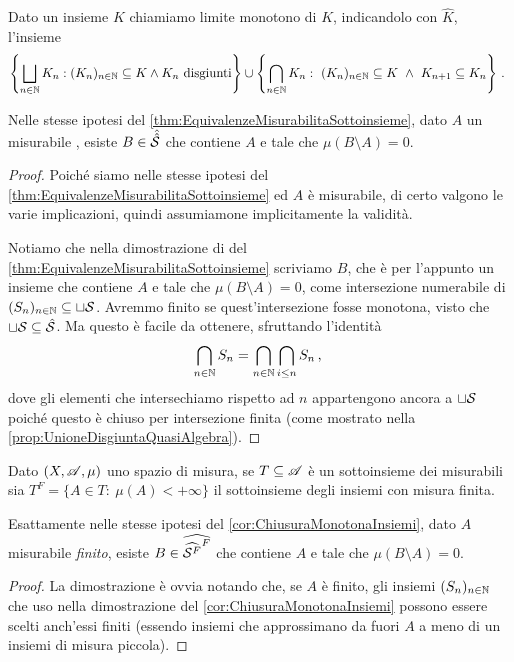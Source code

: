 \begin{corollary}\label{cor:ChiusuraMonotonaInsiemi}
	Dato un insieme $K$ chiamiamo limite monotono di $K$, indicandolo con $\hat K$, l'insieme
	\begin{equation*}
		\left\{\bigsqcup_{n\in\N}K_n:(K_n)_{n\in\N}\subseteq K\wedge K_n \text{ disgiunti}\right\}\cup
		\left\{\bigcap_{n\in\N}K_n:\ (K_n)_{n\in\N}\subseteq K\ \wedge\ K_{n+1}\subseteq K_n\right\} \punto
	\end{equation*}
	
	Nelle stesse ipotesi del \cref{thm:EquivalenzeMisurabilitaSottoinsieme}, dato $A$ un misurabile \sigfin[o], esiste $B\in\hat{\hat\S}$ che contiene $A$ e tale che $\mu(B\setminus A)=0$.
\end{corollary}
\begin{proof}
	Poiché siamo nelle stesse ipotesi del \cref{thm:EquivalenzeMisurabilitaSottoinsieme} ed $A$ è misurabile, di certo valgono le varie implicazioni, quindi assumiamone implicitamente la validità.
	
	Notiamo che nella dimostrazione di  del \cref{thm:EquivalenzeMisurabilitaSottoinsieme} scriviamo $B$, che è per l'appunto un insieme che contiene $A$ e tale che $\mu(B\setminus A)=0$, come intersezione numerabile di $(S_n)_{n\in\N}\subseteq \sqcup \S$.
	Avremmo finito se quest'intersezione fosse monotona, visto che $\sqcup \S\subseteq \hat \S$.
	Ma questo è facile da ottenere, sfruttando l'identità
	\begin{equation*}
		\bigcap_{n\in\N} S_n = \bigcap_{n\in\N} \bigcap_{i\le n} S_n \virgola
	\end{equation*}
	dove gli elementi che intersechiamo rispetto ad $n$ appartengono ancora a $\sqcup \S$ poiché questo è chiuso per intersezione finita (come mostrato nella \cref{prop:UnioneDisgiuntaQuasiAlgebra}).
\end{proof}

\begin{corollary}\label{cor:ChiusuraMonotonaInsiemiFiniti}
	Dato $(X,\A,\mu)$ uno spazio di misura, se $T\subseteq\A$ è un sottoinsieme dei misurabili sia $T^F=\{A\in T:\ \mu(A)<+\infty\}$ il sottoinsieme degli insiemi con misura finita.
	
	Esattamente nelle stesse ipotesi del \cref{cor:ChiusuraMonotonaInsiemi}, dato $A$ misurabile \emph{finito}, esiste $B\in\widehat{{\widehat{\S^F}}^F}$ che contiene $A$ e tale che $\mu(B\setminus A)=0$.
\end{corollary}
\begin{proof}
	La dimostrazione è ovvia notando che, se $A$ è finito, gli insiemi $(S_n)_{n\in\N}$ che uso nella dimostrazione del \cref{cor:ChiusuraMonotonaInsiemi} possono essere scelti anch'essi finiti (essendo insiemi che approssimano da fuori $A$ a meno di un insiemi di misura piccola).
\end{proof}



